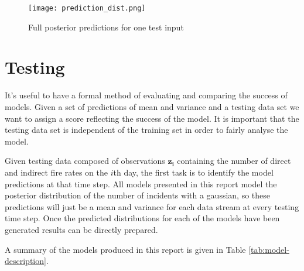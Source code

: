 \documentclass[a4paper,11pt]{report}
\begin{document}
\begin{figure}[h!]
\centering
\texttt{[image: prediction\_dist.png]}
\caption{Full posterior predictions for one test input}
\label{fig:inference2}
\end{figure}
\newpage

\chapter{Testing}

It's useful to have a formal method of evaluating and comparing the success of models. Given a set of predictions of mean and variance and a testing data set we want to assign a score reflecting the success of the model. It is important that the testing data set is independent of the training set in order to fairly analyse the model. \par

Given testing data composed of observations \(\mathbf{z_i}\) containing the number of direct and indirect fire rates on the \(i\)th day, the first task is to identify the model predictions at that time step. All models presented in this report model the posterior distribution of the number of incidents with a gaussian, so these predictions will just be a mean and variance for each data stream at every testing time step. Once the predicted distributions for each of the models have been generated results can be directly prepared.

A summary of the models produced in this report is given in Table \ref{tab:model-description}.
\end{document}
